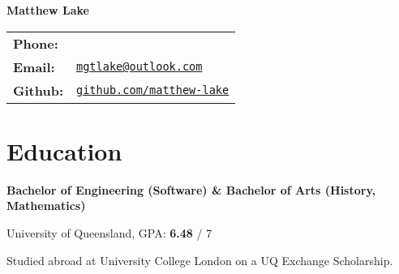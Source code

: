 \documentclass[a4paper]{article}
\def\name{Matthew Lake}
\renewenvironment{itemize}{
  \begin{list}{}{
    \setlength{\leftmargin}{1.5em}
  }
}{
  \end{list}
}
\newcommand{\dateitem}[1] {\item[\textbf{#1 :}]}
\newcommand{\accentcolour}{\color{darkgray}}
\newcommand{\resumesection}[1]{\section*{\accentcolour #1}}
\renewcommand{\accentcolour}{\color{NavyBlue}}
\renewcommand{\resumesection}[1]{\section*{\accentcolour #1}}
\begin{document}
\centerline{\rmfamily \accentcolour \Huge \bfseries \name}

\begin{center}
	\begin{tabular}{ll}
		\textbf{Phone:} 		&  \\
		\textbf{Email:} 		& \href{mailto:mgtlake@outlook.com}{\tt mgtlake@outlook.com} \\
		\textbf{Github:}		& \href{github.com/matthew-lake}{\tt github.com/matthew-lake}
	\end{tabular}
\end{center}

\resumesection{Education}
\begin{itemize}
	\dateitem{2014 -- 2019} {\textbf{Bachelor of Engineering (Software) \&
			Bachelor of Arts (History, Mathematics)}
		
		University of Queensland, GPA: \textbf{6.48} / 7
		
		\dateitem{2017} Studied abroad at University College London on a UQ Exchange Scholarship.
	}
	
\end{itemize}
\end{document}
